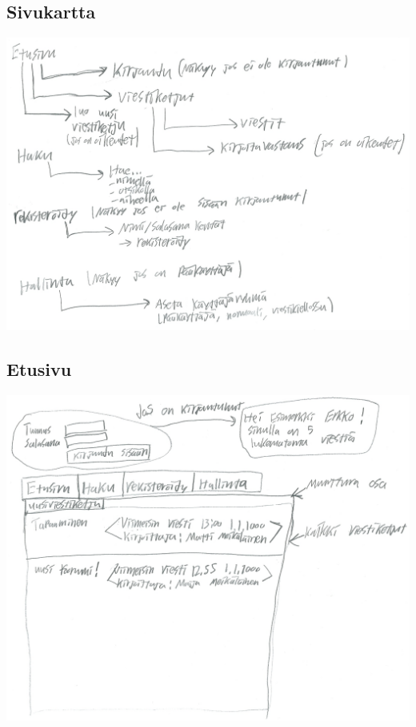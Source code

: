 \documentclass[a4paper, 12pt, finnish]{article}
\begin{document}
\subsection{Sivukartta}
\includegraphics[width=\textwidth,height=\textheight,keepaspectratio]{kayttoliittymakaavio.png}

\subsection{Etusivu}
\includegraphics[width=\textwidth,height=\textheight,keepaspectratio]{etusivu.png}
\end{document}
